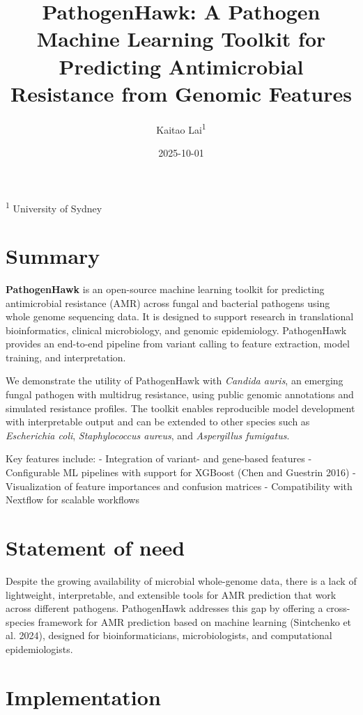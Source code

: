 \documentclass[
]{article}
\title{PathogenHawk: A Pathogen Machine Learning Toolkit for Predicting
Antimicrobial Resistance from Genomic Features}
\author{Kaitao Lai\textsuperscript{1}}
\date{2025-10-01}
\begin{document}
\maketitle

\textsuperscript{1} University of Sydney

\section{Summary}\label{summary}

\textbf{PathogenHawk} is an open-source machine learning toolkit for
predicting antimicrobial resistance (AMR) across fungal and bacterial
pathogens using whole genome sequencing data. It is designed to support
research in translational bioinformatics, clinical microbiology, and
genomic epidemiology. PathogenHawk provides an end-to-end pipeline from
variant calling to feature extraction, model training, and
interpretation.

We demonstrate the utility of PathogenHawk with \emph{Candida auris}, an
emerging fungal pathogen with multidrug resistance, using public genomic
annotations and simulated resistance profiles. The toolkit enables
reproducible model development with interpretable output and can be
extended to other species such as \emph{Escherichia coli},
\emph{Staphylococcus aureus}, and \emph{Aspergillus fumigatus}.

Key features include: - Integration of variant- and gene-based features
- Configurable ML pipelines with support for XGBoost (Chen and Guestrin
2016) - Visualization of feature importances and confusion matrices -
Compatibility with Nextflow for scalable workflows

\section{Statement of need}\label{statement-of-need}

Despite the growing availability of microbial whole-genome data, there
is a lack of lightweight, interpretable, and extensible tools for AMR
prediction that work across different pathogens. PathogenHawk addresses
this gap by offering a cross-species framework for AMR prediction based
on machine learning (Sintchenko et al. 2024), designed for
bioinformaticians, microbiologists, and computational epidemiologists.

\section{Implementation}\label{implementation}
\end{document}
